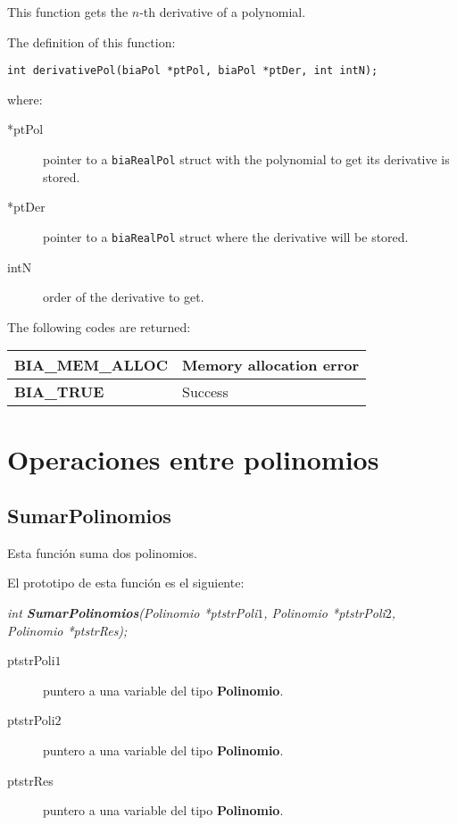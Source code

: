 This function gets the $n$-th derivative of a polynomial.

The definition of this function:
%
\begin{verbatim}
int derivativePol(biaPol *ptPol, biaPol *ptDer, int intN);
\end{verbatim}
%
where:
\begin{description} 
\item[*ptPol] pointer to a \texttt{biaRealPol} struct with the polynomial to get its derivative is stored.
\item[*ptDer] pointer to a \texttt{biaRealPol} struct where the derivative will be stored.
\item[intN] order of the derivative to get.
\end{description}
%
The following codes are returned:
%
\begin{center}
\begin{tabular}{|l|l|}
\hline
\textbf{BIA\_MEM\_ALLOC} & Memory allocation error \\
\hline
\textbf{BIA\_TRUE} & Success \\
\hline
\end{tabular}
\end{center}
%
%

\section{Operaciones entre polinomios}

\subsection{SumarPolinomios}

Esta funci\'on suma dos polinomios.\newline

El prototipo de esta funci\'on es el siguiente:

\begin{center}
\emph{int \textbf{SumarPolinomios}(Polinomio *ptstrPoli$1$,
Polinomio *ptstrPoli$2$, \\Polinomio *ptstrRes);}
\end{center}

\begin{description}
\item[ptstrPoli$1$] puntero a una variable del tipo \textbf{Polinomio}. 
\item[ptstrPoli$2$] puntero a una variable del tipo \textbf{Polinomio}. 
\item[ptstrRes] puntero a una variable del tipo \textbf{Polinomio}.
\end{description}


